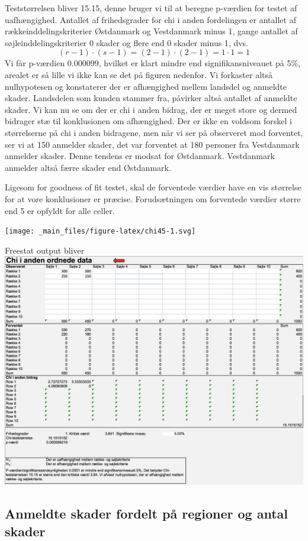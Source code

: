 \documentclass[]{book}
\begin{document}
Teststørrelsen bliver 15.15, denne bruger vi til at beregne p-værdien for testet af uafhængighed. Antallet af frihedsgrader for chi i anden fordelingen er antallet af rækkeinddelingskriterier Østdanmark og Vestdanmark minus 1, gange antallet af søjleinddelingskriterier 0 skader og flere end 0 skader minus 1, dvs. \[(r-1)\cdot(s-1)=(2-1)\cdot(2-1)=1\cdot1=1\]
Vi får p-værdien 0.000099, hvilket er klart mindre end signifikansniveauet på 5\%, arealet er så lille vi ikke kan se det på figuren nedenfor. Vi forkaster altså nulhypotesen og konstaterer der er afhængighed mellem landsdel og anmeldte skader. Landsdelen som kunden stammer fra, påvirker altså antallet af anmeldte skader. Vi kan nu se om der er chi i anden bidrag, der er meget store og dermed bidrager stæ til konklusionen om afhængighed. Der er ikke en voldsom forskel i størrelserne på chi i anden bidragene, men når vi ser på observeret mod forventet, ser vi at 150 anmelder skader, det var forventet at 180 personer fra Vestdanmark anmelder skader. Denne tendens er modsat for Østdanmark. Vestdanmark anmelder altså færre skader end Østdanmark.

Ligesom for goodness of fit testet, skal de forventede værdier have en vis størrelse for at vore konklusioner er præcise. Forudsætningen om forventede værdier større end 5 er opfyldt for alle celler.

\texttt{[image: \_main\_files/figure-latex/chi45-1.svg]}

Freestat output bliver
\includegraphics{img/chiskade.png}

\hypertarget{anmeldte-skader-fordelt-pa-regioner-og-antal-skader}{%
\subsection{Anmeldte skader fordelt på regioner og antal skader}\label{anmeldte-skader-fordelt-pa-regioner-og-antal-skader}}
\end{document}
